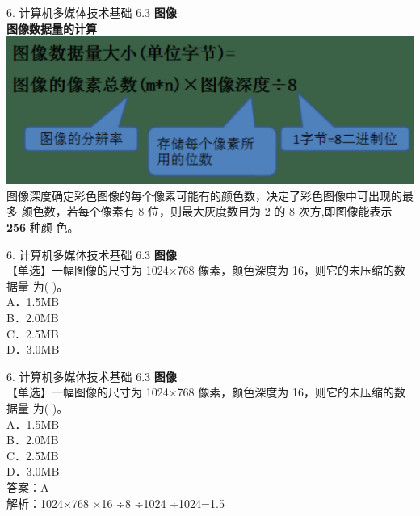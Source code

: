 \documentclass[aspectratio=169]{beamer}
\begin{document}
\begin{frame}[t]{6. 计算机多媒体技术基础} \vspace{20pt}
    6.3 \textbf{图像}\\
    \textbf{图像数据量的计算}\\
    \includegraphics[scale=0.25]{image_data_cal}\\ 
    图像深度确定彩色图像的每个像素可能有的颜色数，决定了彩色图像中可出现的最多
颜色数，若每个像素有 8 位，则最大灰度数目为 2 的 8 次方,即图像能表示 \textbf{256} 种颜
色。\\
\end{frame}

\begin{frame}[t]{6. 计算机多媒体技术基础} \vspace{20pt}
    6.3 \textbf{图像}\\
    【单选】一幅图像的尺寸为 1024×768 像素，颜色深度为 16，则它的未压缩的数据量
为( )。\\
A．1.5MB\\ B．2.0MB\\
C．2.5MB\\ D．3.0MB\\
\end{frame}


\begin{frame}[t]{6. 计算机多媒体技术基础} \vspace{20pt}
    6.3 \textbf{图像}\\
    【单选】一幅图像的尺寸为 1024×768 像素，颜色深度为 16，则它的未压缩的数据量
为( )。\\
A．1.5MB\\ B．2.0MB\\
C．2.5MB\\ D．3.0MB\\
答案：A\\
解析：1024×768 ×16 ÷8 ÷1024 ÷1024=1.5\\
\end{frame}
\end{document}

